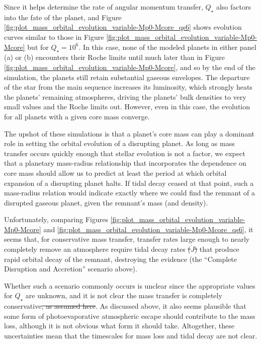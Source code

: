 \documentclass{svjour3}                     %
\providecommand{\DIFdel}[1]{{\protect\color{red}\sout{#1}}}                      %
\providecommand{\DIFdelbegin}{} %
\providecommand{\DIFdelend}{} %
\begin{document}
Since it helps determine the rate of angular momentum transfer, $Q_\star$ also factors into the fate of the planet, and Figure \ref{fig:plot_mass_orbital_evolution_variable-Mp0-Mcore_qs6} shows evolution curves similar to those in Figure \ref{fig:plot_mass_orbital_evolution_variable-Mp0-Mcore} but for $Q_\star = 10^6$. In this case, none of the modeled planets in either panel (a) or (b) encounters their Roche limits until much later than in Figure \ref{fig:plot_mass_orbital_evolution_variable-Mp0-Mcore}, and so by the end of the simulation, the planets still retain substantial gaseous envelopes. The departure of the star from the main sequence increases its luminosity, which strongly heats the planets' remaining atmospheres, driving the planets' bulk densities to very small values and the Roche limits out. However, even in this case, the evolution for all planets with a given core mass converge. 

The upshot of these simulations is that a planet's core mass can play a dominant role in setting the orbital evolution of a disrupting planet. As long as mass transfer occurs quickly enough that stellar evolution is not a factor, we expect that a planetary mass-radius relationship that incorporates the dependence on core mass should allow us to predict at least the period at which orbital expansion of a disrupting planet halts. If tidal decay ceased at that point, such a mass-radius relation would indicate exactly where we could find the remnant of a disrupted gaseous planet, given the remnant's mass (and density).

Unfortunately, comparing Figures \ref{fig:plot_mass_orbital_evolution_variable-Mp0-Mcore} and \ref{fig:plot_mass_orbital_evolution_variable-Mp0-Mcore_qs6}, it seems that, for conservative mass transfer, transfer rates large enough to nearly completely remove an atmosphere require tidal decay rates \DIFdelbegin \DIFdel{($\dot{J}$) }\DIFdelend that produce rapid orbital decay of the remnant, destroying the evidence (the ``Complete Disruption and Accretion'' scenario above). 

Whether such a scenario commonly occurs is unclear since the appropriate values for $Q_\star$ are unknown, and it is not clear the mass transfer is completely conservative\DIFdelbegin \DIFdel{, as assumed here}\DIFdelend . As discussed above, it also seems plausible that some form of photoevaporative atmospheric escape should contribute to the mass loss, although it is not obvious what form it should take. Altogether, these uncertainties mean that the timescales for mass loss and tidal decay are not clear. 
\end{document}
